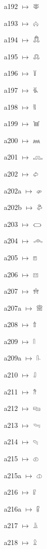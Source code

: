{\noindent a192 $\mapsto$ {\ahfont 𔓛}\par
\noindent a193 $\mapsto$ {\ahfont 𔓜}\par
\noindent a194 $\mapsto$ {\ahfont 𔓝}\par
\noindent a195 $\mapsto$ {\ahfont 𔓞}\par
\noindent a196 $\mapsto$ {\ahfont 𔓟}\par
\noindent a197 $\mapsto$ {\ahfont 𔓠}\par
\noindent a198 $\mapsto$ {\ahfont 𔓡}\par
\noindent a199 $\mapsto$ {\ahfont 𔓢}\par
\noindent a200 $\mapsto$ {\ahfont 𔓣}\par
\noindent a201 $\mapsto$ {\ahfont 𔓤}\par
\noindent a202 $\mapsto$ {\ahfont 𔓥}\par
\noindent a202a $\mapsto$ {\ahfont 𔓦}\par
\noindent a202b $\mapsto$ {\ahfont 𔓧}\par
\noindent a203 $\mapsto$ {\ahfont 𔓨}\par
\noindent a204 $\mapsto$ {\ahfont 𔓩}\par
\noindent a205 $\mapsto$ {\ahfont 𔓪}\par
\noindent a206 $\mapsto$ {\ahfont 𔓫}\par
\noindent a207 $\mapsto$ {\ahfont 𔓬}\par
\noindent a207a $\mapsto$ {\ahfont 𔓭}\par
\noindent a208 $\mapsto$ {\ahfont 𔓮}\par
\noindent a209 $\mapsto$ {\ahfont 𔓯}\par
\noindent a209a $\mapsto$ {\ahfont 𔓰}\par
\noindent a210 $\mapsto$ {\ahfont 𔓱}\par
\noindent a211 $\mapsto$ {\ahfont 𔓲}\par
\noindent a212 $\mapsto$ {\ahfont 𔓳}\par
\noindent a213 $\mapsto$ {\ahfont 𔓴}\par
\noindent a214 $\mapsto$ {\ahfont 𔓵}\par
\noindent a215 $\mapsto$ {\ahfont 𔓶}\par
\noindent a215a $\mapsto$ {\ahfont 𔓷}\par
\noindent a216 $\mapsto$ {\ahfont 𔓸}\par
\noindent a216a $\mapsto$ {\ahfont 𔓹}\par
\noindent a217 $\mapsto$ {\ahfont 𔓺}\par
\noindent a218 $\mapsto$ {\ahfont 𔓻}\par
}
